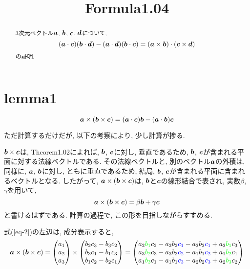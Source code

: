 \documentclass{jsarticle}
\title{Formula1.04}
\newcommand*{\mbold}[1]{\mbox{\boldmath $#1$}}
\begin{document}
\maketitle
\begin{abstract}
  3次元ベクトル$\mbold{a}$, $\mbold{b}$, $\mbold{c}$, $\mbold{d}$について, 
  \begin{equation}\label{eq-1}
    (\mbold{a} \cdot \mbold{c})(\mbold{b} \cdot \mbold{d}) 
    -(\mbold{a} \cdot \mbold{d})(\mbold{b} \cdot \mbold{c}) 
    = (\mbold{a} \times \mbold{b}) \cdot (\mbold{c} \times \mbold{d}) 
  \end{equation}
  の証明. 
\end{abstract}

\section{lemma1}\label{lemma-1}
\begin{equation}\label{eq-2}
  \mbold{a} \times (\mbold{b} \times \mbold{c})
  = (\mbold{a} \cdot \mbold{c})\mbold{b} - (\mbold{a} \cdot \mbold{b})\mbold{c}
\end{equation}

ただ計算するだけだが, 以下の考察により, 少し計算が捗る. 

$\mbold{b} \times \mbold{c}$は, Theorem1.02によれば, $\mbold{b}$, $\mbold{c}$に対し, 垂直であるため, $\mbold{b}$, $\mbold{c}$が含まれる平面に対する法線ベクトルである. 
その法線ベクトルと, 別のベクトル$\mbold{a}$の外積は, 同様に, $\mbold{a}$, $\mbold{b}$に対し, ともに垂直であるため, 結局, $\mbold{b}$, $\mbold{c}$が含まれる平面に含まれるベクトルとなる. 
したがって, $\mbold{a} \times (\mbold{b} \times \mbold{c})$は, $\mbold{b}$と$\mbold{c}$の線形結合で表され, 
実数$\beta$, $\gamma$を用いて, 
\[
  \mbold{a} \times (\mbold{b} \times \mbold{c}) = \beta \mbold{b} + \gamma \mbold{c}
\]
と書けるはずである. 計算の過程で, この形を目指しながらすすめる. 

式(\ref{eq-2})の左辺は, 成分表示すると, 
\begin{equation}\label{eq-3}
  \mbold{a} \times (\mbold{b} \times \mbold{c})
  = \begin{pmatrix}
      a_1 \\
      a_2 \\
      a_3
    \end{pmatrix}
    \times
    \begin{pmatrix}
      b_2 c_3 - b_3 c_2 \\
      b_3 c_1 - b_1 c_3 \\
      b_1 c_2 - b_2 c_1
    \end{pmatrix}
  = \begin{pmatrix}
      a_2 \textcolor{green}{b_1} c_2 - a_2 b_2 \textcolor{blue}{c_1} - a_3 b_3 \textcolor{blue}{c_1} + a_3 \textcolor{green}{b_1} c_3 \\
      a_3 \textcolor{green}{b_2} c_3 - a_3 b_3 \textcolor{blue}{c_2} - a_1 b_1 \textcolor{blue}{c_2} + a_1 \textcolor{green}{b_2} c_1 \\
      a_1 \textcolor{green}{b_3} c_1 - a_1 b_1 \textcolor{blue}{c_3} - a_2 b_2 \textcolor{blue}{c_3} + a_2 \textcolor{green}{b_3} c_2
    \end{pmatrix}
\end{equation}
\end{document}
